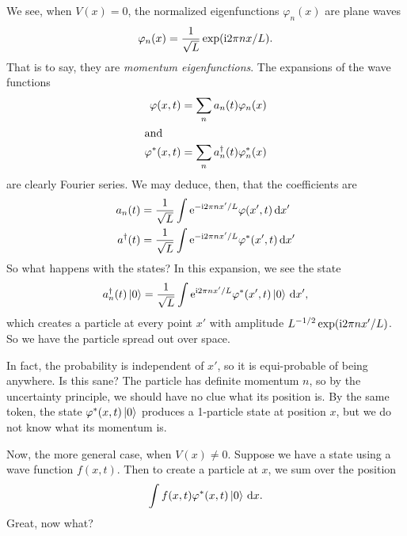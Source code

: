 We see, when $V(x)=0$, the normalized eigenfunctions $\varphi_{n}(x)$
are plane waves
\begin{equation}
\varphi_{n}(x) = \frac{1}{\sqrt{L}}\exp(\mathrm{i}2\pi nx/L).
\end{equation}
That is to say, they are \emph{momentum eigenfunctions}. The expansions
of the wave functions
\begin{subequations}
\begin{align}
\varphi(x,t) &=\sum_{n}a_{n}(t)\varphi_{n}(x)\\
\intertext{and}
\varphi^{*}(x,t) &=\sum_{n}a^{\dagger}_{n}(t)\varphi^{*}_{n}(x)
\end{align}
\end{subequations}
are clearly Fourier series. We may deduce, then, that the coefficients are
\begin{subequations}
\begin{align}
a_{n}(t) &= \frac{1}{\sqrt{L}}\int\mathrm{e}^{-\mathrm{i}2\pi nx'/L}\varphi(x',t)\,\mathrm{d}
x'\\
a^{\dagger}(t)&= \frac{1}{\sqrt{L}}\int\mathrm{e}^{-\mathrm{i}2\pi nx'/L}\varphi^{*}(x',t)\,\mathrm{d}
x'
\end{align}
\end{subequations}
So what happens with the states? In this expansion, we see the state
\begin{equation}
a^{\dagger}_{n}(t)\ket{0} = \frac{1}{\sqrt{L}}\int
\mathrm{e}^{\mathrm{i}2\pi nx'/L}\varphi^{*}(x',t)\ket{0}\,\mathrm{d} x',
\end{equation}
which creates a particle at every point $x'$ with amplitude
$L^{-1/2}\exp(\mathrm{i}2\pi nx'/L)$. So we have the particle spread out over
space.

In fact, the probability is independent of $x'$, so it is equi-probable
of being anywhere. Is this sane? The particle has definite momentum $n$,
so by the uncertainty principle, we should have no clue what its position
is. By the same token, the state $\varphi^{*}(x,t)\ket{0}$ produces a
1-particle state at position $x$, but we do not know what its momentum is.

Now, the more general case, when $V(x)\neq0$. Suppose we have a state
using a wave function $f(x,t)$. Then to create a particle at $x$, we sum
over the position
\begin{equation*}
\int f(x,t)\varphi^{*}(x,t)\ket{0}\,\mathrm{d} x.
\end{equation*}
Great, now what?

